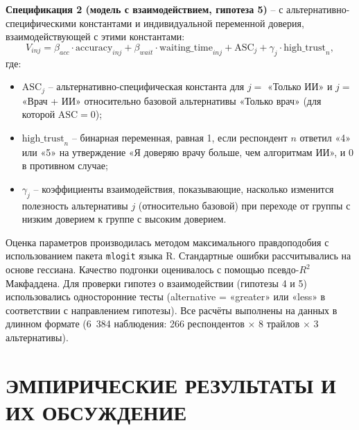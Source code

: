 \documentclass[12pt, a4paper]{article}
\begin{document}
\textbf{Спецификация 2 (модель с взаимодействием, гипотеза 5)} -- с альтернативно-специфическими константами и индивидуальной переменной доверия, взаимодействующей с этими константами:
\[
V_{inj} = \beta_{acc} \cdot \text{accuracy}_{inj} + \beta_{wait} \cdot \text{waiting\_time}_{inj} + \text{ASC}_j + \gamma_j \cdot \text{high\_trust}_n,
\]
где:
\begin{itemize}
    \item $\text{ASC}_j$ -- альтернативно-специфическая константа для $j =$ «Только ИИ» и $j =$ «Врач + ИИ» относительно базовой альтернативы «Только врач» (для которой $\text{ASC}=0$);
    \item $\text{high\_trust}_n$ -- бинарная переменная, равная 1, если респондент $n$ ответил «4» или «5» на утверждение «Я доверяю врачу больше, чем алгоритмам ИИ», и 0 в противном случае;
    \item $\gamma_j$ -- коэффициенты взаимодействия, показывающие, насколько изменится полезность альтернативы $j$ (относительно базовой) при переходе от группы с низким доверием к группе с высоким доверием.
\end{itemize}

Оценка параметров производилась методом максимального правдоподобия с использованием пакета \texttt{mlogit} языка R. Стандартные ошибки рассчитывались на основе гессиана. Качество подгонки оценивалось с помощью псевдо-$R^2$ Макфаддена. Для проверки гипотез о взаимодействии (гипотезы 4 и 5) использовались односторонние тесты (alternative = «greater» или «less» в соответствии с направлением гипотезы). Все расчёты выполнены на данных в длинном формате (6~384 наблюдения: 266 респондентов $\times$ 8 трайлов $\times$ 3 альтернативы).

\newpage

\section{ЭМПИРИЧЕСКИЕ РЕЗУЛЬТАТЫ И ИХ ОБСУЖДЕНИЕ}
\end{document}
